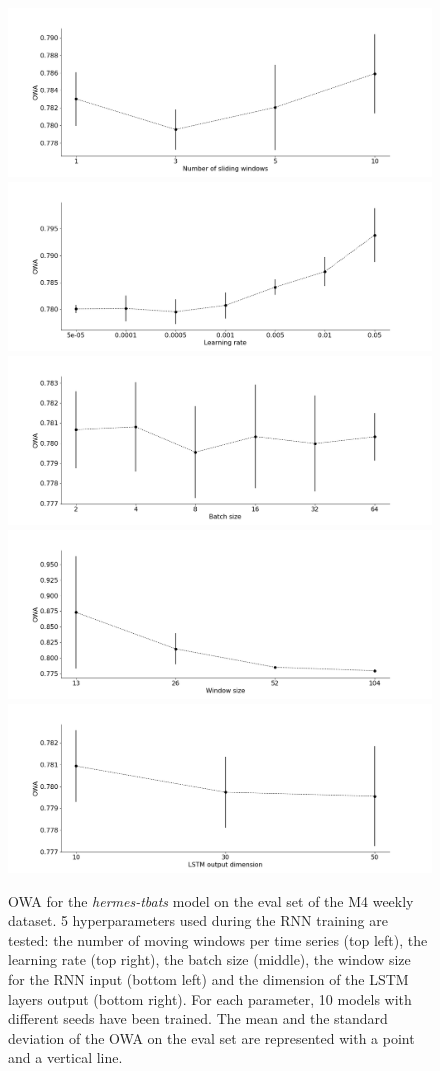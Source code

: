 \documentclass[review]{elsarticle}
\begin{document}
 
\begin{figure}
\centering
  \includegraphics[width=.49\linewidth]{m4_sliding_window.png}
  \includegraphics[width=.49\linewidth]{m4_learning_rate.png}
  \includegraphics[width=1.\linewidth]{m4_batch_size.png}
  \includegraphics[width=.49\linewidth]{m4_window_size.png}
  \includegraphics[width=.49\linewidth]{m4_lstm_dim.png}
\caption{OWA for the \textit{hermes-tbats} model on the eval set of the M4 weekly dataset. 5 hyperparameters used during the RNN training are tested: the number of moving windows per time series (top left), the learning rate (top right), the batch size (middle), the window size for the RNN input (bottom left) and the dimension of the LSTM layers output (bottom right). For each parameter, 10 models with different seeds have been trained. The mean and the standard deviation of the OWA on the eval set are represented with a point and a vertical line.}
\label{fig:m4parameter}
\end{figure}


\end{document}
